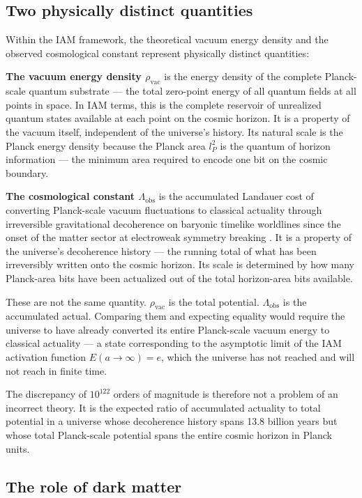 \documentclass[12pt,a4paper]{article}
\begin{document}
\subsection{Two physically distinct quantities}

Within the IAM framework, the theoretical vacuum energy density and the
observed cosmological constant represent physically distinct quantities:

\textbf{The vacuum energy density $\rho_\mathrm{vac}$} is the energy
density of the complete Planck-scale quantum substrate — the total
zero-point energy of all quantum fields at all points in space. In IAM
terms, this is the complete reservoir of unrealized quantum states
available at each point on the cosmic horizon. It is a property of the
vacuum itself, independent of the universe's history. Its natural scale
is the Planck energy density because the Planck area $l_P^2$ is the
quantum of horizon information — the minimum area required to encode one
bit on the cosmic boundary.

\textbf{The cosmological constant $\Lambda_\mathrm{obs}$} is the
accumulated Landauer cost of converting Planck-scale vacuum fluctuations
to classical actuality through irreversible gravitational decoherence on
baryonic timelike worldlines since the onset of the matter sector at
electroweak symmetry breaking \citep{mahaffey2026_higgs}. It is a
property of the universe's decoherence history — the running total of
what has been irreversibly written onto the cosmic horizon. Its scale is
determined by how many Planck-area bits have been actualized out of the
total horizon-area bits available.

These are not the same quantity. $\rho_\mathrm{vac}$ is the total
potential. $\Lambda_\mathrm{obs}$ is the accumulated actual. Comparing
them and expecting equality would require the universe to have already
converted its entire Planck-scale vacuum energy to classical actuality —
a state corresponding to the asymptotic limit of the IAM activation
function $E(a \to \infty) = e$, which the universe has not reached and
will not reach in finite time.

The discrepancy of $10^{122}$ orders of magnitude is therefore not a
problem of an incorrect theory. It is the expected ratio of accumulated
actuality to total potential in a universe whose decoherence history spans
13.8 billion years but whose total Planck-scale potential spans the
entire cosmic horizon in Planck units.

\subsection{The role of dark matter}
\end{document}
